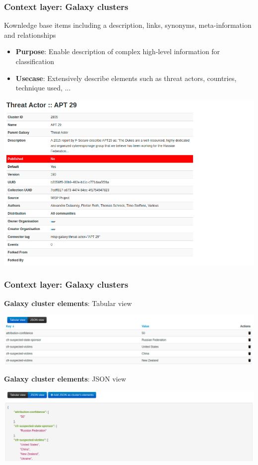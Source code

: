 \begin{frame}
    \frametitle{Context layer: Galaxy clusters}
    Kownledge base items including a description, links, synonyms, meta-information and relationships
    \begin{itemize}
        \item[] \textbf{Purpose}: Enable description of complex high-level information for classification
        \item[] \textbf{Usecase}: Extensively describe elements such as threat actors, countries, technique used, ...
    \end{itemize}
    \begin{center}
        \includegraphics[width=0.65\linewidth]{screenshots/cluster-view.png}
    \end{center}
\end{frame}
\begin{frame}
    \frametitle{Context layer: Galaxy clusters}
    {\bf Galaxy cluster elements}: Tabular view
    \begin{center}
        \includegraphics[width=1.0\linewidth]{screenshots/cluster-elements-tab.png}
    \end{center}
    \vspace{1em}
    {\bf Galaxy cluster elements}: JSON view
    \begin{center}
        \includegraphics[width=1.0\linewidth]{screenshots/cluster-elements-json.png}
    \end{center}
\end{frame}

